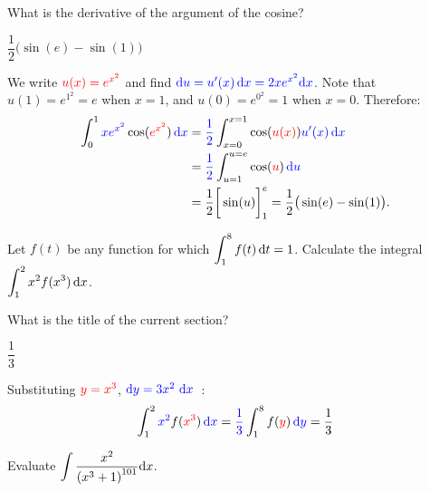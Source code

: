 \begin{hint}
What is the derivative of the argument of the cosine?
\end{hint}

\begin{answer}
$\dfrac{1}{2}\big( \sin(e) - \sin(1) \big)$
\end{answer}

\begin{solution}
We write $\textcolor{red}{u(x) = e^{x^2}}$ and find $\textcolor{blue}{\mathrm{d}u = u'(x)\,\mathrm{d}x=2x e^{x^2}\mathrm{d}x}$. Note that $u(1)=e^{1^2}=e$ when $x=1$, and $u(0)=e^{0^2}=1$ when $x=0$. Therefore:
\begin{align*}
\int_{0}^{1} \textcolor{blue}{x e^{x^2}} \cos (\textcolor{red}{e^{x^2}}) \,\textcolor{blue}{\mathrm{d}x} &= \textcolor{blue}{\frac{1}{2}}\int_{x=0}^{x=1} \cos (\textcolor{red}{u(x)}) \textcolor{blue}{u'(x)\,\mathrm{d}x }\\
&=\textcolor{blue}{ \frac{1}{2}}\int_{u=1}^{u=e} \cos(\textcolor{red}u)\,\color{blue}\mathrm{d}u\\
&= \frac{1}{2}\bigg[\sin(u) \bigg]_1^e
= \frac{1}{2}\big( \sin(e) - \sin(1) \big).
\end{align*}
\end{solution}

\begin{question}[2001D]
Let $f(t)$ be any function for which $\displaystyle\int_1^8 f(t)\,\mathrm{d}t=1$.
Calculate the integral $\displaystyle\int_1^2 x^2 f(x^3)\,\mathrm{d}x$.
\end{question}

\begin{hint}
What is the title of the current section?
\end{hint}

\begin{answer}
$\dfrac{1}{3}$
\end{answer}

\begin{solution}
Substituting $\textcolor{red}{y=x^3}$, $\textcolor{blue}{\mathrm{d}y=3x^2\ \mathrm{d}x}$\ :
\begin{align*}
\int_1^2 \textcolor{blue}{x^2} f(\textcolor{red}{x^3})\,\textcolor{blue}{\mathrm{d}x}
=\textcolor{blue}{\frac{1}{3}}\int_1^8 f(\textcolor{red}{y})\,\textcolor{blue}{\mathrm{d}y}
=\frac{1}{3}
\end{align*}
\end{solution}

\begin{Mquestion}[M121 2014A]
Evaluate $\displaystyle \int  \frac{x^2}{{(x^3+1)}^{101}}\mathrm{d}x$.
\end{Mquestion}

